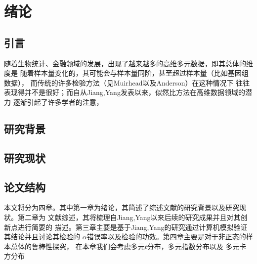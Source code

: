 \chapter{绪论}

\section{引言}
随着生物统计、金融领域的发展，出现了越来越多的高维多元数据，即其总体的维度是
随着样本量变化的，其可能会与样本量同阶，甚至超过样本量（比如基因组数据），
而传统的许多检验方法（见Muirhead\cite{kato2010high}以及Anderson\cite{}）在这种情况下
往往表现得并不是很好；而自从Jiang,Yang\cite{}发表以来，似然比方法在高维数据领域的潜力
逐渐引起了许多学者的注意，
\section{研究背景}

\section{研究现状}

\section{论文结构}
本文将分为四章。其中第一章为绪论，其简述了综述文献的研究背景以及研究现状。第二章为
文献综述，其将梳理自Jiang,Yang\cite{}以来后续的研究成果并且对其创新点进行简要的
描述。第三章主要是基于Jiang,Yang\cite{}的研究通过计算机模拟验证其结论并且讨论其检验的
$\alpha$错误率以及检验的功效。第四章主要是对于非正态的样本总体的鲁棒性探究，
在本章我们会考虑多元$t$分布，多元指数分布以及
多元卡方分布